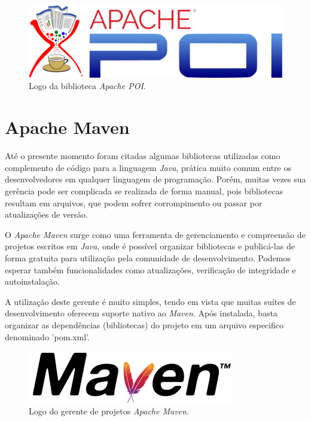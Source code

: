 \documentclass[
	12pt,			%
	openright,		%
	oneside,	
	a4paper,		%
	english,		%
	brazil			%
]{abntex2/abntex2}  %
\begin{document}
			\begin{figure}[H]
				\caption{\label{apache-poi}Logo da biblioteca \textit{Apache POI}.}
				\begin{center}
					\includegraphics[scale=0.35]{img/apache-poi}
				\end{center}
			\end{figure}

		\section{Apache Maven}
		
			Até o presente momento foram citadas algumas bibliotecas utilizadas como complemento de código para a linguagem \textit{Java}, prática muito comum entre os desenvolvedores em qualquer linguagem de programação. Porém, muitas vezes sua gerência pode ser complicada se realizada de forma manual, pois bibliotecas resultam em arquivos, que podem sofrer corrompimento ou passar por atualizações de versão.
			
			O \textit{Apache Maven} \cite{maven} surge como uma ferramenta de gerenciamento e compreensão de projetos escritos em \textit{Java}, onde é possível organizar bibliotecas e publicá-las de forma gratuita para utilização pela comunidade de desenvolvimento. Podemos esperar também funcionalidades como atualizações, verificação de integridade e autoinstalação.
			
			A utilização deste gerente é muito simples, tendo em vista que muitas suítes de desenvolvimento oferecem suporte nativo ao \textit{Maven}. Após instalada, basta organizar as dependências (bibliotecas) do projeto em um arquivo especifico denominado 'pom.xml'.

			\begin{figure}[H]
				\caption{\label{maven-logo}Logo do gerente de projetos \textit{Apache Maven}.}
				\begin{center}
					\includegraphics[scale=0.5]{img/maven-logo}
				\end{center}
			\end{figure}
\end{document}
